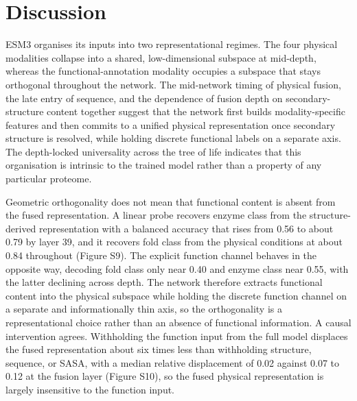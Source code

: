 \documentclass[11pt]{article}
\begin{document}
\section{Discussion}

ESM3 organises its inputs into two representational regimes. The four physical modalities collapse into a shared, low-dimensional subspace at
mid-depth, whereas the functional-annotation modality occupies a subspace that stays
orthogonal throughout the network. The mid-network timing of physical fusion, the
late entry of sequence, and the dependence of fusion depth on secondary-structure
content together suggest that the network first builds modality-specific features and
then commits to a unified physical representation once secondary structure is
resolved, while holding discrete functional labels on a separate axis. The
depth-locked universality across the tree of life indicates that this organisation is
intrinsic to the trained model rather than a property of any particular proteome.

Geometric orthogonality does not mean that functional content is absent from the
fused representation. A linear probe recovers enzyme class from the structure-derived
representation with a balanced accuracy that rises from 0.56 to about 0.79 by layer
39, and it recovers fold class from the physical conditions at about 0.84 throughout
(Figure S9). The explicit function channel behaves in the opposite way, decoding fold
class only near 0.40 and enzyme class near 0.55, with the latter declining across
depth. The network therefore extracts functional content into the physical subspace
while holding the discrete function channel on a separate and informationally thin
axis, so the orthogonality is a representational choice rather than an absence of
functional information. A causal intervention agrees. Withholding the function input
from the full model displaces the fused representation about six times less than
withholding structure, sequence, or SASA, with a median relative displacement of 0.02
against 0.07 to 0.12 at the fusion layer (Figure S10), so the fused physical
representation is largely insensitive to the function input.
\end{document}
